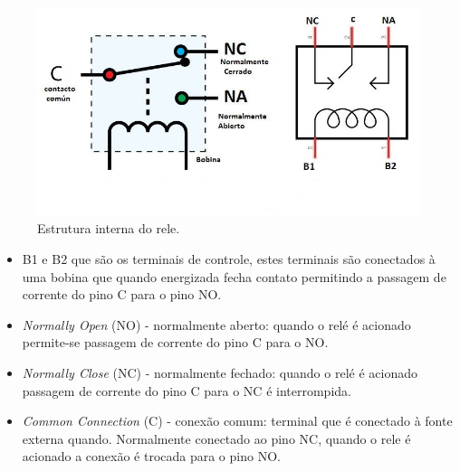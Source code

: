 \begin{figure}[H]
\centering
\includegraphics[scale=0.4]{./04-figuras/reles.jpg}
\caption{Estrutura interna do rele.}
\vspace{-\baselineskip}
\label{fig:rele}
\end{figure}

\begin{itemize}[itemsep=0em]
\item B1 e B2 que são os terminais de controle, estes terminais são conectados à uma bobina que quando energizada fecha contato permitindo a passagem de corrente do pino C para o pino NO.
\item \textit{Normally Open} (NO) - normalmente aberto: quando o relé é acionado permite-se passagem de corrente do pino C para o NO.
\item \textit{Normally Close} (NC) - normalmente fechado: quando o relé é acionado passagem de corrente do pino C para o NC é interrompida.
\item \textit{Common Connection} (C) - conexão comum: terminal que é  conectado à fonte externa quando. Normalmente conectado ao pino NC, quando o rele é acionado a conexão é trocada para o pino NO.
\end{itemize}

